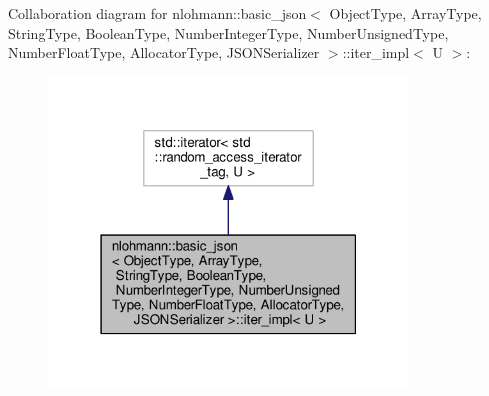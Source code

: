 Collaboration diagram for nlohmann\+:\+:basic\+\_\+json$<$ Object\+Type, Array\+Type, String\+Type, Boolean\+Type, Number\+Integer\+Type, Number\+Unsigned\+Type, Number\+Float\+Type, Allocator\+Type, J\+S\+O\+N\+Serializer $>$\+:\+:iter\+\_\+impl$<$ U $>$\+:
\nopagebreak
\begin{figure}[H]
\begin{center}
\leavevmode
\includegraphics[width=271pt]{classnlohmann_1_1basic__json_1_1iter__impl__coll__graph}
\end{center}
\end{figure}
